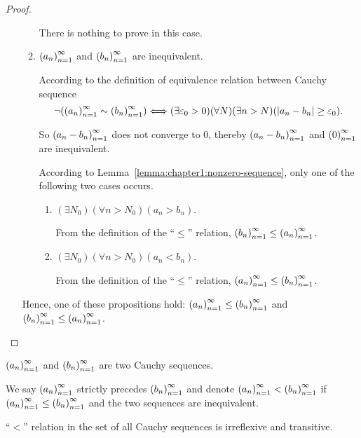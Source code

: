 \begin{proof}
\begin{itemize}
\begin{enumerate}[label={\textbf{Case \arabic*.}},itemsep=0pt]
                        There is nothing to prove in this case.

                  \item ${\left({a_{n}}\right)}^{\infty}_{n=1}$ and ${\left({b_{n}}\right)}^{\infty}_{n=1}$ are inequivalent.

                        According to the definition of equivalence relation between Cauchy sequence
                        \[
                            \neg({\left({a_{n}}\right)}^{\infty}_{n=1}\sim{\left({b_{n}}\right)}^{\infty}_{n=1})\Longleftrightarrow (\exists\varepsilon_{0} > 0)(\forall N)(\exists n > N)(\left\vert{a_{n} - b_{n}}\right\vert\ge\varepsilon_{0}).
                        \]

                        So ${\left({a_{n} - b_{n}}\right)}^{\infty}_{n=1}$ does not converge to $0$, thereby ${\left({a_{n} - b_{n}}\right)}^{\infty}_{n=1}$ and ${\left({0}\right)}^{\infty}_{n=1}$ are inequivalent.

                        According to Lemma~\ref{lemma:chapter1:nonzero-sequence}, only one of the following two cases occurs.

                        \begin{enumerate}[itemsep=0pt]
                            \item $(\exists N_{0})(\forall n > N_{0})(a_{n} > b_{n})$.

                                  From the definition of the ``$\le$'' relation, ${\left({b_{n}}\right)}^{\infty}_{n=1}\le{\left({a_{n}}\right)}^{\infty}_{n=1}$.

                            \item $(\exists N_{0})(\forall n > N_{0})(a_{n} < b_{n})$.

                                  From the definition of the ``$\le$'' relation, ${\left({a_{n}}\right)}^{\infty}_{n=1}\le{\left({b_{n}}\right)}^{\infty}_{n=1}$.
                        \end{enumerate}
              \end{enumerate}

              Hence, one of these propositions hold: ${\left({a_{n}}\right)}^{\infty}_{n=1}\le{\left({b_{n}}\right)}^{\infty}_{n=1}$ and ${\left({b_{n}}\right)}^{\infty}_{n=1}\le{\left({a_{n}}\right)}^{\infty}_{n=1}$.
    \end{itemize}
\end{proof}

\begin{definition}
    ${\left({a_{n}}\right)}^{\infty}_{n=1}$ and ${\left({b_{n}}\right)}^{\infty}_{n=1}$ are two Cauchy sequences.

    We say ${\left({a_{n}}\right)}^{\infty}_{n=1}$ strictly precedes ${\left({b_{n}}\right)}^{\infty}_{n=1}$ and denote ${\left({a_{n}}\right)}^{\infty}_{n=1} < {\left({b_{n}}\right)}^{\infty}_{n=1}$ if ${\left({a_{n}}\right)}^{\infty}_{n=1}\le{\left({b_{n}}\right)}^{\infty}_{n=1}$ and the two sequences are inequivalent.
\end{definition}

\begin{theorem}
    ``$<$'' relation in the set of all Cauchy sequences is irreflexive and transitive.
\end{theorem}


